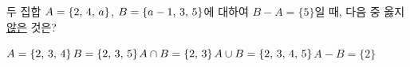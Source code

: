 두 집합 $A=\{2,\mkern3mu 4,\mkern3mu a\}$, $B=\{a-1,\mkern3mu 3,\mkern3mu 5\}$에 대하여 $B-A=\{5\}$일 때, 다음 중 옳지 \underline{않은} 것은? 
\begin{choicesii}{$A=\{2,\mkern3mu 3,\mkern3mu 4\}$}{$B=\{2,\mkern3mu 3,\mkern3mu 5\}$}{$A\cap B=\{2,\mkern3mu 3\}$}{$A\cup B=\{2,\mkern3mu 3,\mkern3mu 4,\mkern3mu 5\}$}{$A-B=\{2\}$}\end{choicesii}
